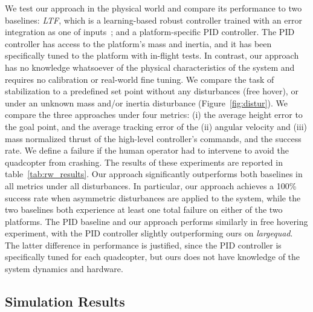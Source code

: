 We test our approach in the physical world and compare its performance to two baselines: \emph{LTF}, which is a learning-based robust controller trained with an error integration as one of inputs~\cite{LTF}; and a platform-specific PID controller.
%
The PID controller has access to the platform's mass and inertia, and it has been specifically tuned to the platform with in-flight tests.
%
In contrast, our approach has no knowledge whatsoever of the physical characteristics of the system and requires no calibration or real-world fine tuning.
%
We compare the task of stabilization to a predefined set point without any disturbances (free hover), or under an unknown mass and/or inertia disturbance (Figure~\ref{fig:distur}).
%
We compare the three approaches under four metrics: (i) the average height error to the goal point, and the average tracking error of the (ii) angular velocity and (iii) mass normalized thrust of the high-level controller's commands, and the success rate.
%
We define a failure if the human operator had to intervene to avoid the quadcopter from crashing.
%
The results of these experiments are reported in table~\ref{tab:rw_results}.
%
Our approach significantly outperforms both baselines in all metrics under all disturbances. In particular, our approach achieves a 100\% success rate when asymmetric disturbances are applied to the system, while the two baselines both experience at least one total failure on either of the two platforms. 
%
The PID baseline and our approach performs similarly in free hovering experiment, with the PID controller slightly outperforming ours on \emph{largequad}.  
%
The latter difference in performance is justified, since the PID controller is specifically tuned for each quadcopter, but ours does not have knowledge of the system dynamics and hardware. 
%
%
%
%
%


\subsection{Simulation Results}

